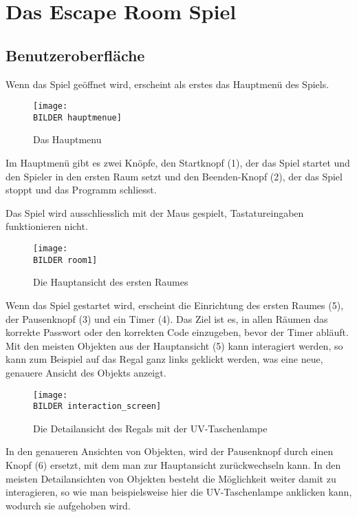 \section{Das Escape Room Spiel}

\subsection{Benutzeroberfläche}
Wenn das Spiel geöffnet wird, erscheint als erstes das Hauptmenü des Spiels.

\begin{figure}[htb]
	\centering
		\texttt{[image: \\BILDER hauptmenue]}
 	\caption{Das Hauptmenu}
  \label{fig:hauptmenu}
\end{figure}

 
Im Hauptmenü gibt es zwei Knöpfe, den Startknopf (1), der das Spiel startet und den Spieler in den ersten Raum setzt und den Beenden-Knopf (2), der das Spiel stoppt und das Programm schliesst.

Das Spiel wird ausschliesslich mit der Maus gespielt, Tastatureingaben funktionieren nicht. \newpage

\begin{figure}[h!]
	\centering
		\texttt{[image: \\BILDER room1]}
 	\caption{Die Hauptansicht des ersten Raumes}
  \label{fig:hauptansicht}
\end{figure}

Wenn das Spiel gestartet wird, erscheint die Einrichtung des ersten Raumes (5), der Pausenknopf (3) und ein Timer (4). Das Ziel ist es, in allen Räumen das korrekte Passwort oder den korrekten Code einzugeben, bevor der Timer abläuft. Mit den meisten Objekten aus der Hauptansicht (5) kann interagiert werden, so kann zum Beispiel auf das Regal ganz links geklickt werden, was eine neue, genauere Ansicht des Objekts anzeigt.

\begin{figure}[h!]
	\centering
		\texttt{[image: \\BILDER interaction\_screen]}
 	\caption{Die Detailansicht des Regals mit der UV-Taschenlampe}
  \label{fig:detailansicht}
\end{figure}

In den genaueren Ansichten von Objekten, wird der Pausenknopf durch einen Knopf (6) ersetzt, mit dem man zur Hauptansicht zurückwechseln kann. In den meisten Detailansichten von Objekten besteht die Möglichkeit weiter damit zu interagieren, so wie man beispielsweise hier die UV-Taschenlampe anklicken kann, wodurch sie aufgehoben wird.

